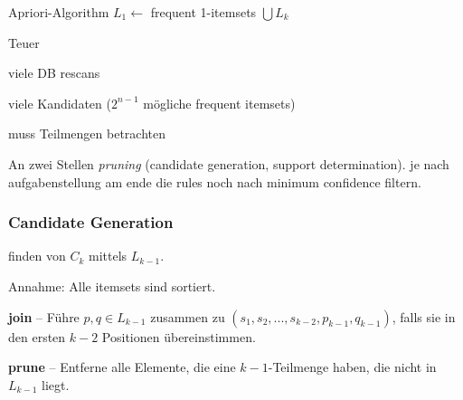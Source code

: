 \documentclass[10pt]{article} %
\begin{document}
\begin{myalgo}{Apriori-Algorithm}
   $L_1 \gets $ frequent 1-itemsets  \;
   \Return $\bigcup L_k$
\end{myalgo}

\begin{cptitemize}
  \disadvantageit Teuer
  \begin{cptitemize}
  \item viele DB rescans
  \item viele Kandidaten ($2^{n-1}$ mögliche frequent itemsets)
  \item muss Teilmengen betrachten
  \end{cptitemize}
\end{cptitemize}


An zwei Stellen \textit{pruning} (candidate generation, support determination).
je nach aufgabenstellung am ende die rules noch nach minimum confidence filtern.

\subsubsection{Candidate Generation}
finden von $C_k$ mittels $L_{k-1}$.

Annahme: Alle itemsets sind sortiert.
\begin{cptenumerate}
\item \textbf{join} -- Führe $p,q \in L_{k-1}$ zusammen zu $(s_1, s_2, ...,
  s_{k-2}, p_{k-1}, q_{k-1})$, falls sie in den ersten $k-2$ Positionen
  übereinstimmen.
\item \textbf{prune} -- Entferne alle Elemente, die eine $k-1$-Teilmenge haben,
  die nicht in $L_{k-1}$ liegt. 
\end{cptenumerate}

\end{document}

